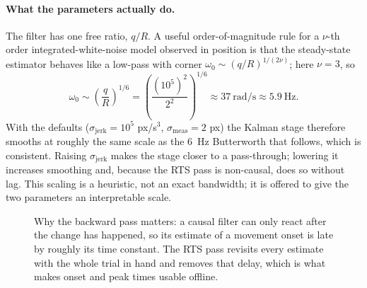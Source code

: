 \documentclass[11pt,a4paper]{article}
\begin{document}
\paragraph{What the parameters actually do.} The filter has one free ratio,
$q/R$. A useful order-of-magnitude rule for a $\nu$-th order
integrated-white-noise model observed in position is that the steady-state
estimator behaves like a low-pass with corner
$\omega_0 \sim (q/R)^{1/(2\nu)}$; here $\nu = 3$, so
\begin{equation}
  \omega_0 \sim \left(\frac{q}{R}\right)^{1/6}
  = \left(\frac{(10^5)^2}{2^2}\right)^{1/6} \approx 37\ \text{rad/s} \approx 5.9\ \text{Hz}.
  \label{eq:corner}
\end{equation}
With the defaults ($\sigma_{\text{jerk}} = 10^5$ px/s$^3$,
$\sigma_{\text{meas}} = 2$ px) the Kalman stage therefore smooths at roughly the
same scale as the 6~Hz Butterworth that follows, which is consistent. Raising
$\sigma_{\text{jerk}}$ makes the stage closer to a pass-through; lowering it
increases smoothing and, because the RTS pass is non-causal, does so without
lag. This scaling is a heuristic, not an exact bandwidth; it is offered to give
the two parameters an interpretable scale.

\begin{figure}[htbp]
\centering
{}
\caption{Why the backward pass matters: a causal filter can only react after the
change has happened, so its estimate of a movement onset is late by roughly its
time constant. The RTS pass revisits every estimate with the whole trial in hand
and removes that delay, which is what makes onset and peak times usable
offline.}
\label{fig:rtslag}
\end{figure}
\end{document}
